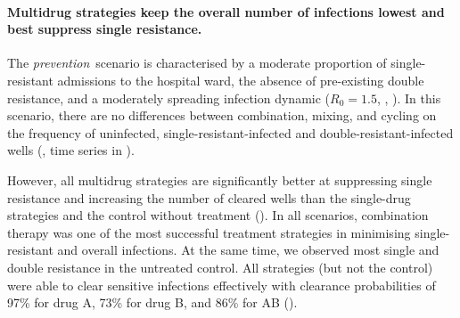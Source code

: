 \paragraph{Multidrug strategies keep the overall number of infections lowest and best suppress single resistance.}
The \textit{prevention}~scenario is characterised by a moderate proportion of single-resistant admissions to the hospital ward, the absence of pre-existing double resistance, and a moderately spreading infection dynamic ($R_0 = 1.5$, ,  ).
In this scenario, there are no differences between combination, mixing, and cycling on the frequency of uninfected, single-resistant-infected and double-resistant-infected wells (, time series in ).

However, all multidrug strategies are significantly better at suppressing single resistance and increasing the number of cleared wells than the single-drug strategies and the control without treatment (). 
In all scenarios, combination therapy was one of the most successful treatment strategies in minimising single-resistant and overall infections. 
At the same time, we observed most single and double resistance in the untreated control.
All strategies (but not the control) were able to clear sensitive infections effectively with clearance probabilities of 97\% for drug A, 73\% for drug B, and 86\% for AB ().


